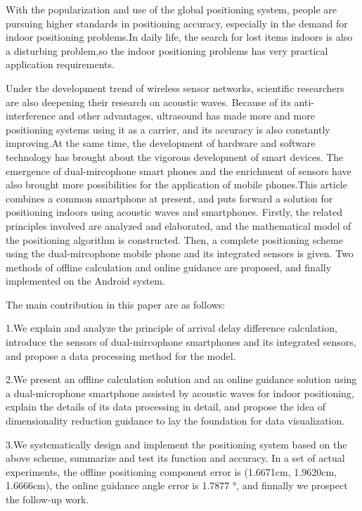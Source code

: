 \documentclass[winfonts,oneside]{njuthesis}
\begin{document}
\begin{englishabstract}
	
	With the popularization and use of the global positioning system, people are pursuing higher standards in positioning accuracy, especially in the demand for indoor positioning problems.In daily life, the search for lost items indoors is also a disturbing problem,so the indoor positioning problems has very practical application requirements.
		
	Under the development trend of wireless sensor networks, scientific researchers are also deepening their research on acoustic waves. Because of its anti-interference and other advantages, ultrasound has made more and more positioning systems using it as a carrier, and its accuracy is also constantly improving.At the same time, the development of hardware and software technology has brought about the vigorous development of smart devices. The emergence of dual-mircophone smart phones and the enrichment of sensors have also brought more possibilities for the application of mobile phones.This article combines a common smartphone at present, and puts forward a solution for positioning indoors using acoustic waves and smartphones. Firstly, the related principles involved are analyzed and elaborated, and the mathematical model of the positioning algorithm is constructed. Then, a complete positioning scheme using the dual-mircophone mobile phone and its integrated sensors is given. Two methods of offline calculation and online guidance are proposed, and finally implemented on the Android system.

	The main contribution in this paper are as follows: 
	
	1.We explain and analyze the principle of arrival delay difference calculation, introduce the sensors of dual-mircophone smartphones and its integrated sensors, and propose a data processing method for the model.
	
	2.We present an offline calculation solution and an online guidance solution using a dual-microphone smartphone assisted by acoustic waves for indoor positioning, explain the details of its data processing in detail, and propose the idea of dimensionality reduction guidance to lay the foundation for data visualization.
	
	3.We systematically design and implement the positioning system based on the above scheme, summarize and test its function and accuracy. In a set of actual experiments, the offline positioning component error is (1.6671cm, 1.9620cm, 1.6666cm), the online guidance angle error is 1.7877 °, and finnally we prospect the follow-up work.

\end{englishabstract}
\end{document}

